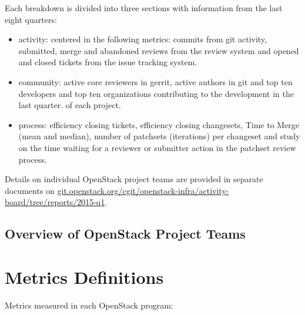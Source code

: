 \documentclass[a4wide,11pt]{report}
\begin{document}
Each breakdown is divided into three sections with information from the last eight quarters: 
\begin{itemize}
\item activity: centered in the following metrics: commits from git activity, submitted, merge and abandoned reviews from the review system and
opened and closed tickets from the issue tracking system. 
\item community: active core reviewers in gerrit, active authors in git and top ten developers and top ten organizations contributing to the development in the last quarter.
of each project.
\item process: efficiency closing tickets, efficiency closing changesets, Time to Merge (mean and median), number of patchsets (iterations) per changeset and study on the time waiting for a reviewer or submitter action in the patchset review process.
\end{itemize}

Details on individual OpenStack project teams are provided in separate documents on {\url{git.openstack.org/cgit/openstack-infra/activity-board/tree/reports/2015-q1}}.

\newpage
\section{Overview of OpenStack Project Teams}





\appendix{}

\chapter{Metrics Definitions}
\label{chap:metrics_definitions}

Metrics measured in each OpenStack program:
\end{document}
